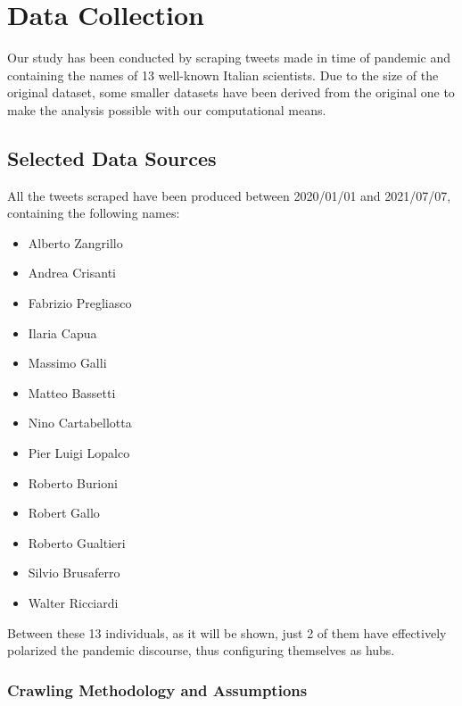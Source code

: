 \documentclass[sigchi]{acmart}
\begin{document}
\section{Data Collection}
Our study has been conducted by scraping tweets made in time of pandemic and containing the names of 13 well-known Italian scientists. Due to the size of the original dataset, some smaller datasets have been derived from the original one to make the analysis possible with our computational means.

\subsection{Selected Data Sources}

All the tweets scraped have been produced between 2020/01/01 and 2021/07/07, containing the following names:
\begin{itemize}
    \item Alberto Zangrillo
    \item Andrea Crisanti
    \item Fabrizio Pregliasco
    \item Ilaria Capua
    \item Massimo Galli
    \item Matteo Bassetti
    \item Nino Cartabellotta
    \item Pier Luigi Lopalco
    \item Roberto Burioni
    \item Robert Gallo
    \item Roberto Gualtieri
    \item Silvio Brusaferro
    \item Walter Ricciardi
\end{itemize}
Between these 13 individuals, as it will be shown, just 2 of them have effectively polarized the pandemic discourse, thus configuring themselves as hubs.


\subsubsection{Crawling Methodology and Assumptions}
\end{document}

